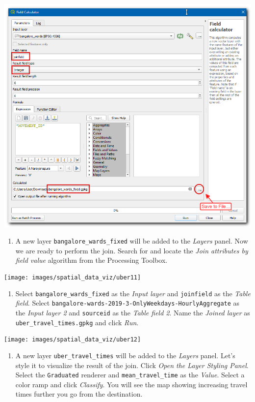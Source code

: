 \documentclass[
  12pt,
  a4paper]{article}
\providecommand{\tightlist}{%
  \setlength{\itemsep}{0pt}\setlength{\parskip}{0pt}}
\begin{document}
\begin{center}\includegraphics[width=0.75\linewidth]{images/spatial_data_viz/uber10} \end{center}

\begin{enumerate}
\def\labelenumi{\arabic{enumi}.}
\setcounter{enumi}{10}
\tightlist
\item
  A new layer \texttt{bangalore\_wards\_fixed} will be added to the
  \emph{Layers} panel. Now we are ready to perform the join. Search for
  and locate the \emph{Join attributes by field value} algorithm from
  the Processing Toolbox.
\end{enumerate}

\begin{center}\texttt{[image: images/spatial\_data\_viz/uber11]} \end{center}

\begin{enumerate}
\def\labelenumi{\arabic{enumi}.}
\setcounter{enumi}{11}
\tightlist
\item
  Select \texttt{bangalore\_wards\_fixed} as the \emph{Input layer} and
  \texttt{joinfield} as the \emph{Table field}. Select
  \texttt{bangalore-wards-2019-3-OnlyWeekdays-HourlyAggregate} as the
  \emph{Input layer 2} and \texttt{sourceid} as the \emph{Table field
  2}. Name the \emph{Joined layer} as \texttt{uber\_travel\_times.gpkg}
  and click \emph{Run}.
\end{enumerate}

\begin{center}\texttt{[image: images/spatial\_data\_viz/uber12]} \end{center}

\begin{enumerate}
\def\labelenumi{\arabic{enumi}.}
\setcounter{enumi}{12}
\tightlist
\item
  A new layer \texttt{uber\_travel\_times} will be added to the
  \emph{Layers} panel. Let's style it to visualize the result of the
  join. Click \emph{Open the Layer Styling Panel}. Select the
  \texttt{Graduated} renderer and \texttt{mean\_travel\_time} as the
  \emph{Value}. Select a color ramp and click \emph{Classify}. You will
  see the map showing increasing travel times further you go from the
  destination.
\end{enumerate}
\end{document}
